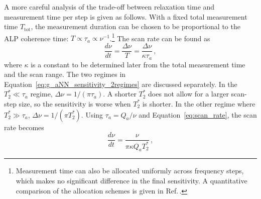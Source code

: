 A more careful analysis of the trade-off between relaxation time and measurement time per step is given as follows.
With a fixed total measurement time $T_{\mathrm{tot}}$, the measurement duration can be chosen to be proportional to the ALP coherence time: $T \propto \tau_a \propto \nu^{-1}$.\footnote{Measurement time can also be allocated uniformly across frequency steps, which makes no significant difference in the final sensitivity. A quantitative comparison of the allocation schemes is given in Ref.\,\cite{Yuzhe2023_FrequencyScanning}.}
The scan rate can be found as
\begin{equation}
    \frac{d\nu}{dt} = \frac{\Delta\nu}{T} =\frac{\Delta\nu}{\kappa \tau_a}
    \,,\label{eq:scan_rate}
\end{equation}
where $\kappa$ is a constant to be determined later from the total measurement time and the scan range.
The two regimes in Equation~\eqref{eq:g_aNN_sensitivity_2regimes} are discussed separately.
In the $ T_2^* \ll \tau_a $ regime, $\Delta\nu = 1 / (\pi \tau_a)$.
A shorter $T_2^*$ does not allow for a larger scan-step size, so the sensitivity is worse when $T_2^*$ is shorter.
In the other regime where $ T_2^* \gg \tau_a $, $\Delta\nu = 1 / (\pi T_2^*)$.
Using $\tau_a = Q_a / \nu$ and Equation~\eqref{eq:scan_rate}, the scan rate becomes
\begin{equation}
    \frac{d\nu}{d t} = \frac{\nu}{\pi \kappa Q_a T_2^* }
    \,,\label{eq:scan_rate_regime1}
\end{equation}
